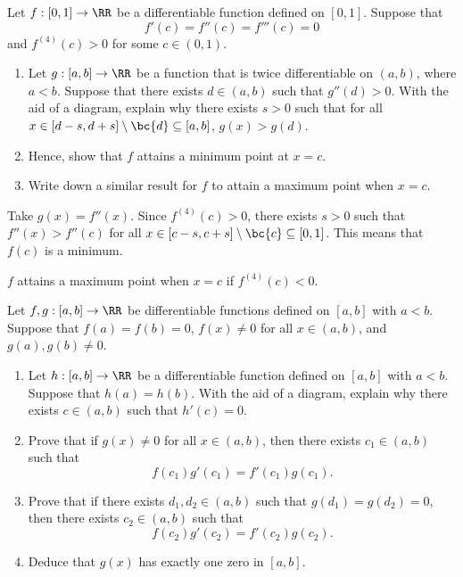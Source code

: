\begin{problem}
    Let $f : [0, 1] \to \RR$ be a differentiable function defined on $[0, 1]$. Suppose that \[f'(c) = f''(c) = f'''(c) = 0\] and $f^{(4)}(c) > 0$ for some $c \in (0, 1)$.

    \begin{enumerate}
        \item Let $g: [a, b] \to \RR$ be a function that is twice differentiable on $(a, b)$, where $a < b$. Suppose that there exists $d \in (a, b)$ such that $g''(d) > 0$. With the aid of a diagram, explain why there exists $s > 0$ such that for all $x \in [d -s , d + s] \setminus \bc{d} \subseteq [a, b]$, $g(x) > g(d)$.
        \item Hence, show that $f$ attains a minimum point at $x = c$.
        \item Write down a similar result for $f$ to attain a maximum point when $x = c$.
    \end{enumerate}
\end{problem}
\begin{solution}
    \begin{ppart}
    \end{ppart}
    \begin{ppart}
        Take $g(x) = f''(x)$. Since $f^{(4)}(c) > 0$, there exists $s > 0$ such that $f''(x) > f''(c)$ for all $x \in [c-s, c+s] \setminus \bc{c} \subseteq [0, 1]$. This means that $f(c)$ is a minimum. 
    \end{ppart}
    \begin{ppart}
        $f$ attains a maximum point when $x = c$ if $f^{(4)}(c) < 0$.
    \end{ppart}
\end{solution}

\begin{problem}
    Let $f, g : [a, b] \to \RR$ be differentiable functions defined on $[a, b]$ with $a < b$. Suppose that $f(a) = f(b) = 0$, $f(x) \neq 0$ for all $x \in (a, b)$, and $g(a), g(b) \neq 0$.

    \begin{enumerate}
        \item Let $h : [a, b] \to \RR$ be a differentiable function defined on $[a, b]$ with $a < b$. Suppose that $h(a) = h(b)$. With the aid of a diagram, explain why there exists $c \in (a, b)$ such that $h'(c) = 0$.
        \item Prove that if $g(x) \neq 0$ for all $x \in (a, b)$, then there exists $c_1 \in (a, b)$ such that \[f(c_1) g'(c_1) = f'(c_1) g(c_1).\]
        \item Prove that if there exists $d_1, d_2 \in (a, b)$ such that $g(d_1) = g(d_2) = 0$, then there exists $c_2 \in (a, b)$ such that \[f(c_2) g'(c_2) = f'(c_2) g(c_2).\]
        \item Deduce that $g(x)$ has exactly one zero in $[a, b]$.
    \end{enumerate}
\end{problem}

